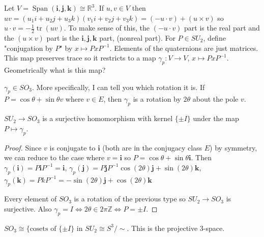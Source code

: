 \documentclass{article}
\newcommand{\R}{\mathbb{R}}
\newcommand{\Z}{\mathbb{Z}}
\newcommand{\ra}[1][]{\xrightarrow{#1}}
\DeclareMathOperator{\Span}{Span}
\DeclareMathOperator{\tr}{tr}
\begin{document}
Let $V=\Span(\mathbf i, \mathbf j,\mathbf k)\cong \R^3$. If $u,v\in V$ then $uv=(u_1i+u_2j+u_3k)(v_1i+v_2j+v_3k)=(-u\cdot v)+(u\times v)$ so $u\cdot v=-\frac{1}{2}\tr(uv)$. To make sense of this, the $(-u\cdot v)$ part is the real part and the $(u\times v)$ part is the $\mathbf i,\mathbf j,\mathbf k$ part, (nonreal part). For $P\in SU_2$, define "conjugation by $P$" by $x\mapsto PxP^{-1}$. Elements of the quaternions are just matrices. This map preserves trace so it restricts to a map $\gamma_p:V\ra V$, $x\mapsto PxP^{-1}$. Geometrically what is this map?
\begin{theorem}
$\gamma_p\in SO_3$. More specifically, I can tell you which rotation it is. If $P=\cos\theta+\sin\theta v$ where $v\in E$, then $\gamma_p$ is a rotation by $2\theta$ about the pole $v$.

$SU_2\ra SO_3$ is a surjective homomorphism with kernel $\{\pm I\}$ under the map $P\mapsto \gamma_p$.
\end{theorem}
\begin{proof}
Since $v$ is conjugate to $\mathbf i$ (both are in the conjugacy class $E$) by symmetry, we can reduce to the case where $v=\mathbf i$ so $P=\cos\theta+\sin\theta\mathbf i$. Then $\gamma_p(\mathbf i)=P\mathbf i P^{-1}=\mathbf i$, $\gamma_p(\mathbf j)=P\mathbf j P^{-1}\cos(2\theta)\mathbf j +\sin(2\theta)\mathbf k$, $\gamma_p(\mathbf k)=PkP^{-1}=-\sin(2\theta)\mathbf j +\cos(2\theta)\mathbf k$

Every element of $SO_3$ is a rotation of the previous type so $SU_2\ra SO_3$ is surjective. Also $\gamma_p=I\iff 2\theta\in 2\pi \Z\iff P=\pm I$.
\end{proof}
\begin{corollary}
$SO_3\cong \{\textrm{cosets of }\{\pm I\}\textrm{ in }SU_2\cong S^3/\sim$. This is the projective 3-space.
\end{corollary}
\end{document}
